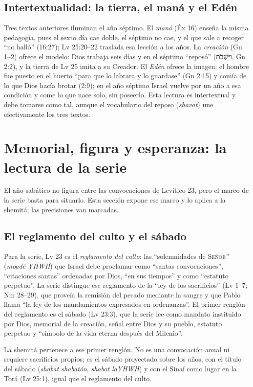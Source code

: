 \documentclass[11pt,letterpaper]{article}
\newcommand{\heb}[1]{\mbox{\foreignlanguage{hebrew}{#1}}}
\newcommand{\SENOR}{\textsc{Señor}}
\begin{document}
\subsection{Intertextualidad: la tierra, el maná y el Edén}
Tres textos anteriores iluminan el año séptimo. El \emph{maná} (Éx 16) enseña la misma pedagogía, pues el sexto día cae doble, el séptimo no cae, y el que sale a recoger ``no halló'' (16:27); Lv 25:20--22 traslada esa lección a los años. La \emph{creación} (Gn 1--2) ofrece el modelo: Dios trabaja seis días y en el séptimo ``reposó'' (\heb{וַיִּשְׁבֹּת}, Gn 2:2), y la tierra de Lv 25 imita a su Creador. El \emph{Edén} ofrece la imagen: el hombre fue puesto en el huerto ``para que lo labrara y lo guardase'' (Gn 2:15) y comía de lo que Dios hacía brotar (2:9); en el año séptimo Israel vuelve por un año a esa condición y come lo que nace solo, sin poseerlo. Esta lectura es intertextual y debe tomarse como tal, aunque el vocabulario del reposo (\emph{shavat}) une efectivamente los tres textos.

\section{Memorial, figura y esperanza: la lectura de la serie}

El año sabático no figura entre las convocaciones de Levítico 23, pero el marco de la serie basta para situarlo. Esta sección expone ese marco y lo aplica a la shemitá; las precisiones van marcadas.

\subsection{El reglamento del culto y el sábado}
Para la serie, Lv 23 es el \emph{reglamento del culto}: las ``solemnidades de \SENOR'' (\emph{moadé YHWH}) que Israel debe proclamar como ``santas convocaciones'', ``citaciones santas'' ordenadas por Dios, ``en sus tiempos'' y como ``estatuto perpetuo''. La serie distingue ese reglamento de la ``ley de los sacrificios'' (Lv 1--7; Nm 28--29), que proveía la remisión del pecado mediante la sangre y que Pablo llama ``la ley de los mandamientos expresados en ordenanzas''. El primer renglón del reglamento es el sábado (Lv 23:3), que la serie lee como mandato instituido por Dios, memorial de la creación, señal entre Dios y su pueblo, estatuto perpetuo y ``símbolo de la vida eterna después del Milenio''.

La shemitá pertenece a ese primer renglón. No es una convocación anual ni requiere sacrificios propios; es el sábado proyectado sobre los años, con el título del sábado (\emph{shabat shabatón}, \emph{shabat laYHWH}) y con el Sinaí como lugar en la Torá (Lv 25:1), igual que el reglamento del culto.
\end{document}
